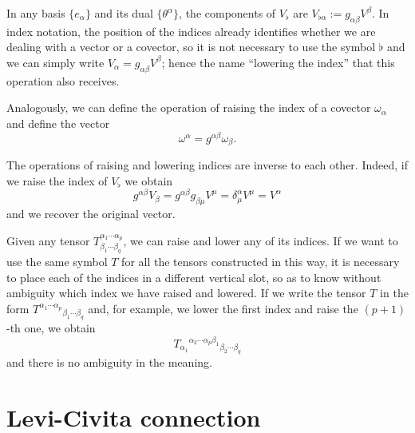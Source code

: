 \begin{points}
\item In any basis $\{e_\alpha\}$ and its dual $\{\theta^\alpha\}$, the components of $V_\flat$ are $V_{\flat\alpha}:=g_{\alpha\beta}V^\beta$. In index notation, the position of the indices already identifies whether we are dealing with a vector or a covector, so it is not necessary to use the symbol $\flat$ and we can simply write $V_\alpha=g_{\alpha\beta}V^\beta$; hence the name ``lowering the index'' that this operation also receives.

\item Analogously, we can define the operation of raising the index of a covector $\omega_\alpha$ and define the vector
\[
  \omega^\alpha=g^{\alpha\beta}\omega_\beta .
\]

\item The operations of raising and lowering indices are inverse to each other. Indeed, if we raise the index of $V_\flat$ we obtain
\[
  g^{\alpha\beta}V_\beta=g^{\alpha\beta}g_{\beta\mu}V^\mu=\delta^\alpha_\mu V^\mu=V^\alpha
\]
and we recover the original vector.

\item Given any tensor $T^{\alpha_1\cdots\alpha_p}_{\beta_1\cdots\beta_q}$, we can raise and lower any of its indices. If we want to use the same symbol $T$ for all the tensors constructed in this way, it is necessary to place each of the indices in a different vertical slot, so as to know without ambiguity which index we have raised and lowered. If we write the tensor $T$ in the form $T^{\alpha_1\cdots\alpha_p}{}_{\beta_1\cdots\beta_q}$ and, for example, we lower the first index and raise the $(p+1)$-th one, we obtain
\[
  T_{\alpha_1}{}^{\alpha_2\cdots\alpha_p\beta_1}{}_{\beta_2\cdots\beta_q}
\]
and there is no ambiguity in the meaning.
\end{points}

\section{Levi-Civita connection}


